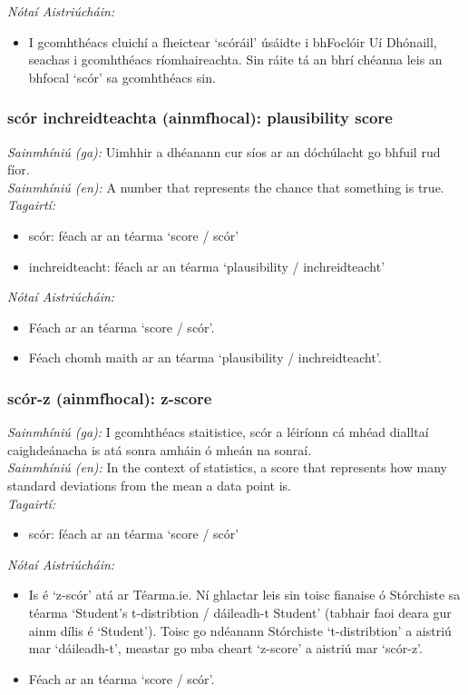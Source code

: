  \noindent \textit{Nótaí Aistriúcháin:}
\begin{itemize}
	\item I gcomhthéacs cluichí a fheictear `scóráil' úsáidte i bhFoclóir Uí Dhónaill, seachas i gcomhthéacs ríomhaireachta. Sin ráite tá an bhrí chéanna leis an bhfocal `scór' sa gcomhthéacs sin.
\end{itemize}


\subsubsection*{scór inchreidteachta (ainmfhocal): plausibility score}
 \noindent \textit{Sainmhíniú (ga):} Uimhhir a dhéanann cur síos ar an dóchúlacht go bhfuil rud fíor.
\\
 \noindent \textit{Sainmhíniú (en):} A number that represents the chance that something is true.
\\
 \noindent \textit{Tagairtí:}
\begin{itemize}
	\item scór: féach ar an téarma `score / scór'
	\item inchreidteacht: féach ar an téarma `plausibility / inchreidteacht'
\end{itemize}

 \noindent \textit{Nótaí Aistriúcháin:}
\begin{itemize}
	\item Féach ar an téarma `score / scór'.
	\item Féach chomh maith ar an téarma `plausibility / inchreidteacht'.
\end{itemize}


\subsubsection*{scór-z (ainmfhocal): z-score}
 \noindent \textit{Sainmhíniú (ga):} I gcomhthéacs staitistice, scór a léiríonn cá mhéad dialltaí caighdeánacha is atá sonra amháin ó mheán na sonraí.
\\
 \noindent \textit{Sainmhíniú (en):} In the context of statistics, a score that represents how many standard deviations from the mean a data point is.
\\
 \noindent \textit{Tagairtí:}
\begin{itemize}
	\item scór: féach ar an téarma `score / scór'
\end{itemize}

 \noindent \textit{Nótaí Aistriúcháin:}
\begin{itemize}
	\item Is é `z-scór' atá ar Téarma.ie. Ní ghlactar leis sin toisc fianaise ó Stórchiste sa téarma `Student's t-distribtion / dáileadh-t Student' (tabhair faoi deara gur ainm dílis é `Student'). Toisc go ndéanann Stórchiste `t-distribtion' a aistriú mar `dáileadh-t', meastar go mba cheart `z-score' a aistriú mar `scór-z'.
	\item Féach ar an téarma `score / scór'.
\end{itemize}


